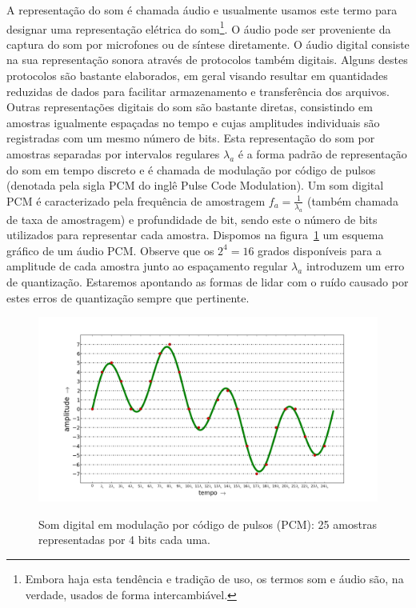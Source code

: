 A representação do som é chamada áudio e usualmente usamos este termo para designar uma representação elétrica do som\footnote{Embora haja esta tendência e tradição de uso, os termos
som e áudio são, na verdade, usados de forma intercambiável.}. O áudio pode ser proveniente da captura do som por microfones ou de síntese diretamente. O áudio digital consiste na sua representação sonora através de protocolos também digitais. Alguns destes protocolos são bastante elaborados, em geral visando resultar em quantidades reduzidas de dados para facilitar armazenamento e transferência dos arquivos. Outras representações digitais do som são bastante diretas, consistindo em amostras igualmente espaçadas no tempo e cujas amplitudes individuais são registradas com um mesmo número de bits. Esta representação do som por amostras separadas por intervalos regulares $\lambda_a$ é a forma padrão de representação do som em tempo discreto e é chamada de modulação por código de pulsos (denotada pela sigla PCM do inglê Pulse Code Modulation).
Um som digital PCM é caracterizado pela frequência de amostragem $f_a=\frac{1}{\lambda_a}$ (também chamada de taxa de amostragem) e profundidade de bit, sendo este o número de bits utilizados para representar cada amostra. Dispomos na figura~\ref{fig:PCM} um esquema gráfico de um áudio PCM. Observe que os $2^4=16$ grados disponíveis para a amplitude de cada amostra junto ao espaçamento regular $\lambda_a$ introduzem um erro de quantização. Estaremos apontando as formas de lidar com o ruído causado por estes erros de quantização sempre que pertinente.


\begin{figure}[h!]
    \centering
    \caption{Som digital em modulação por código de pulsos (PCM): 25 amostras representadas por 4 bits cada uma.}
        \includegraphics[width=\textwidth]{figuras/pcm}
        \label{fig:PCM}
\end{figure}

